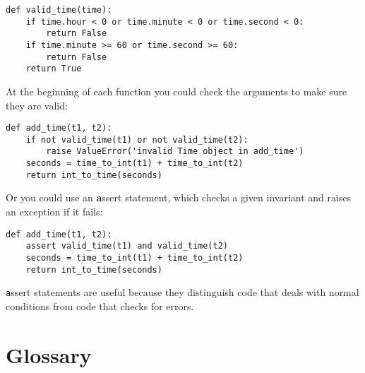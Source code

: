 \documentclass[
DIV=11,
fontsize=12,
twoside,
headinclude=false,
titlepage=firstiscover,
abstract=true,
headsepline=true,
footsepline=true,
chapterprefix=true, %
headings=big,
bibliography=totoc,%
captions=tableheading
]{scrbook}
\theoremstyle{definition}
\begin{document}
\begin{lstlisting}
def valid_time(time):
    if time.hour < 0 or time.minute < 0 or time.second < 0:
        return False
    if time.minute >= 60 or time.second >= 60:
        return False
    return True
\end{lstlisting}
%
At the beginning of each function you could check the
arguments to make sure they are valid:

\begin{lstlisting}
def add_time(t1, t2):
    if not valid_time(t1) or not valid_time(t2):
        raise ValueError('invalid Time object in add_time')
    seconds = time_to_int(t1) + time_to_int(t2)
    return int_to_time(seconds)
\end{lstlisting}
%
Or you could use an {\textbf assert statement}, which checks a given invariant
and raises an exception if it fails:

\begin{lstlisting}
def add_time(t1, t2):
    assert valid_time(t1) and valid_time(t2)
    seconds = time_to_int(t1) + time_to_int(t2)
    return int_to_time(seconds)
\end{lstlisting}
%
{\texttt assert} statements are useful because they distinguish
code that deals with normal conditions from code
that checks for errors.


\section{Glossary}
\end{document}
